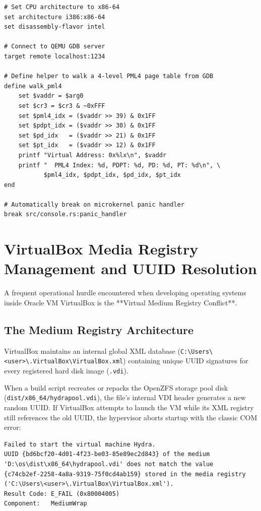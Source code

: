 \begin{lstlisting}[caption={Automated GDB Configuration Script (\texttt{.gdbinit})}]
# Set CPU architecture to x86-64
set architecture i386:x86-64
set disassembly-flavor intel

# Connect to QEMU GDB server
target remote localhost:1234

# Define helper to walk a 4-level PML4 page table from GDB
define walk_pml4
    set $vaddr = $arg0
    set $cr3 = $cr3 & ~0xFFF
    set $pml4_idx = ($vaddr >> 39) & 0x1FF
    set $pdpt_idx = ($vaddr >> 30) & 0x1FF
    set $pd_idx   = ($vaddr >> 21) & 0x1FF
    set $pt_idx   = ($vaddr >> 12) & 0x1FF
    printf "Virtual Address: 0x%lx\n", $vaddr
    printf "  PML4 Index: %d, PDPT: %d, PD: %d, PT: %d\n", \
           $pml4_idx, $pdpt_idx, $pd_idx, $pt_idx
end

# Automatically break on microkernel panic handler
break src/console.rs:panic_handler
\end{lstlisting}

\section{VirtualBox Media Registry Management and UUID Resolution}
\label{sec:vbox_uuid_resolution}

A frequent operational hurdle encountered when developing operating systems inside Oracle VM VirtualBox is the **Virtual Medium Registry Conflict**.

\subsection{The Medium Registry Architecture}
VirtualBox maintains an internal global XML database (\texttt{C:\textbackslash Users\textbackslash <user>\textbackslash.VirtualBox\textbackslash VirtualBox.xml}) containing unique UUID signatures for every registered hard disk image (\texttt{.vdi}).

When a build script recreates or repacks the OpenZFS storage pool disk (\texttt{dist/x86\_64/hydrapool.vdi}), the file's internal VDI header generates a new random UUID. If VirtualBox attempts to launch the VM while its XML registry still references the old UUID, the hypervisor aborts startup with the classic COM error:
\begin{lstlisting}[caption={VirtualBox UUID Conflict Error Message}]
Failed to start the virtual machine Hydra.
UUID {bd6bcf20-4d01-4f23-be03-85e89ec2d843} of the medium 
'D:\os\dist\x86_64\hydrapool.vdi' does not match the value 
{c74cb2ef-2258-4a8a-9319-75f0cd4ab159} stored in the media registry 
('C:\Users\<user>\.VirtualBox\VirtualBox.xml').
Result Code: E_FAIL (0x80004005)
Component:   MediumWrap
\end{lstlisting}


